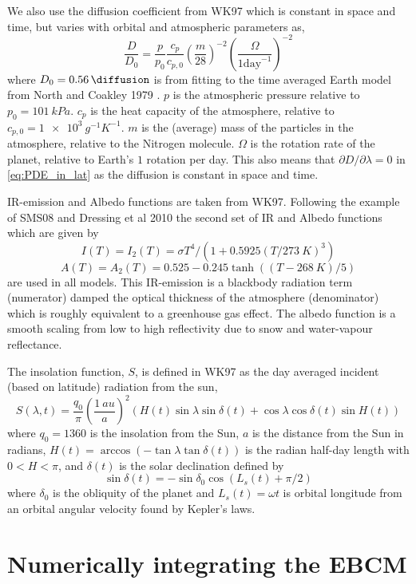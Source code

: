 \documentclass[12pt, onecolumn]{revtex4-2}    %
\begin{document}
We also use the diffusion coefficient from WK97 which is constant in space and time, but varies with orbital and atmospheric parameters as,
$$
    \frac{D}{D_0} = \frac{p}{p_0} \frac{c_p}{c_{p,0}} \left(\frac{m}{28}\right)^{-2} \left(\frac{\Omega}{1 \text{day}^{-1}}\right)^{-2}
$$
where $D_0 = \qty{0.56}{\diffusion}$ is from fitting to the time averaged Earth model from North and Coakley 1979 \cite{NC79}.
$p$ is the atmospheric pressure relative to $p_0 = \qty{101}{kPa}$.
$c_p$ is the heat capacity of the atmosphere, relative to $c_{p,0} = \qty{1e3}{g^{-1} K^{-1}}$.
$m$ is the (average) mass of the particles in the atmosphere, relative to the Nitrogen molecule.
$\Omega$ is the rotation rate of the planet, relative to Earth's $1$ rotation per day.
This also means that $\partial D / \partial \lambda = 0$ in \eqref{eq:PDE_in_lat} as the diffusion is constant in space and time.

IR-emission and Albedo functions are taken from WK97. Following the example of SMS08 and Dressing et al 2010 \cite{Dressing10} the second set of IR and Albedo functions which are given by
$$
    I(T) = I_2(T) = \sigma T^4 / (1 + 0.5925 (T/\qty{273}{K}) ^ 3)
$$
$$
    A(T) = A_2(T) = 0.525 - 0.245 \tanh((T-\qty{268}{K}) / 5)
$$
are used in all models.
This IR-emission is a blackbody radiation term (numerator) damped the optical thickness of the atmosphere (denominator) which is roughly equivalent to a greenhouse gas effect.
The albedo function is a smooth scaling from low to high reflectivity due to snow and water-vapour reflectance.

The insolation function, $S$, is defined in WK97 as the day averaged incident (based on latitude) radiation from the sun,
$$
    S(\lambda, t) = \frac{q_0}{\pi} \left(\frac{\qty{1}{au}}{a}\right)^2 (H(t) \sin{\lambda} \sin{\delta(t)} + \cos{\lambda} \cos{\delta(t)} \sin{H(t)})
$$
where $q_0=1360$ is the insolation from the Sun,
$a$ is the distance from the Sun in radians,
$H(t) = \arccos(-\tan\lambda \tan \delta(t))$ is the radian half-day length with $0 < H < \pi$,
and $\delta(t)$ is the solar declination defined by
$$
    \sin\delta(t) = -\sin\delta_0 \cos(L_s(t) + \pi/2)
$$
where $\delta_0$ is the obliquity of the planet and $L_s(t) = \omega t$ is orbital longitude from an orbital angular velocity found by Kepler's laws.

\section{Numerically integrating the EBCM} \label{sec:solve_PDE}
\end{document}
